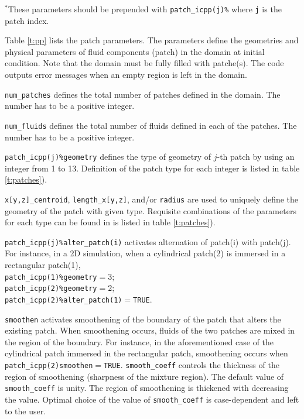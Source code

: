 \documentclass[11pt]{article}
\begin{document}
\begin{center}
\footnotesize{$^*$These parameters should be prepended with \texttt{patch\_icpp(j)\%} where \texttt{j} is the patch index. }
\end{center}

Table \ref{t:pp} lists the patch parameters. The parameters define the geometries and physical parameters of fluid components (patch) in the domain at initial condition. Note that the domain must be fully filled with patche(s). The code outputs error messages when an empty region is left in the domain.

\texttt{num\_patches} defines the total number of patches defined in the domain. The number has to be a positive integer.

\texttt{num\_fluids} defines the total number of fluids defined in each of the patches. The number has to be a positive integer.

\texttt{patch\_icpp(j)\%geometry} defines the type of geometry of $j$-th patch by using an integer from 1 to 13. Definition of the patch type for each integer is listed in table \ref{t:patches}).

\texttt{x[y,z]\_centroid}, \texttt{length\_x[y,z]}, and/or \texttt{radius} are used to uniquely define the geometry of the patch with given type. Requisite combinations of the parameters for each type can be found in is listed in table \ref{t:patches}).

\texttt{patch\_icpp(j)\%alter\_patch(i)} activates alternation of patch(i) with patch(j).
For instance, in a 2D simulation, when a cylindrical patch(2) is immersed in a rectangular patch(1),\\
\indent\texttt{patch\_icpp(1)\%geometry}$=3$;\\
\indent\texttt{patch\_icpp(2)\%geometry}$=2$;\\
\indent\texttt{patch\_icpp(2)\%alter\_patch(1)}$=$\texttt{TRUE}.

\texttt{smoothen} activates smoothening of the boundary of the patch that alters the existing patch.
When smoothening occurs, fluids of the two patches are mixed in the region of the boundary.
For instance, in the aforementioned case of the cylindrical patch immersed in the rectangular patch, smoothening occurs when \texttt{patch\_icpp(2)smoothen}$=$\texttt{TRUE}.
\texttt{smooth\_coeff} controls the thickness of the region of smoothening (sharpness of the mixture region). The default value of \texttt{smooth\_coeff} is unity. The region of smoothening is thickened with decreasing the value.
Optimal choice of the value of \texttt{smooth\_coeff} is case-dependent and left to the user.
\end{document}

